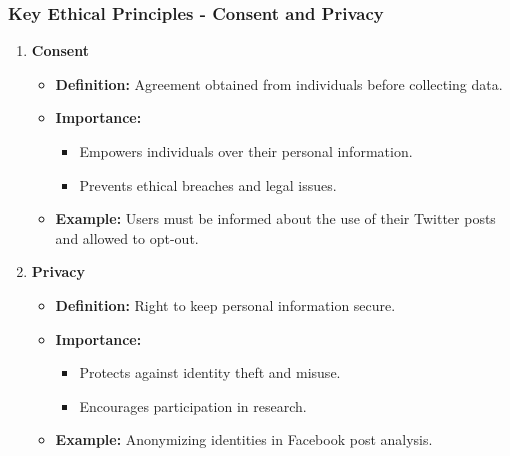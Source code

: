 \documentclass{beamer}
\begin{document}
\begin{frame}[fragile]
    \frametitle{Key Ethical Principles - Consent and Privacy}
    \begin{enumerate}
        \item \textbf{Consent}
            \begin{itemize}
                \item \textbf{Definition:} Agreement obtained from individuals before collecting data.
                \item \textbf{Importance:}
                    \begin{itemize}
                        \item Empowers individuals over their personal information.
                        \item Prevents ethical breaches and legal issues.
                    \end{itemize}
                \item \textbf{Example:} Users must be informed about the use of their Twitter posts and allowed to opt-out.
            \end{itemize}
        \item \textbf{Privacy}
            \begin{itemize}
                \item \textbf{Definition:} Right to keep personal information secure.
                \item \textbf{Importance:}
                    \begin{itemize}
                        \item Protects against identity theft and misuse.
                        \item Encourages participation in research.
                    \end{itemize}
                \item \textbf{Example:} Anonymizing identities in Facebook post analysis.
            \end{itemize}
    \end{enumerate}
\end{frame}
\end{document}
